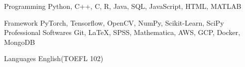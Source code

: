 \vspace{-5.0mm}         
\begin{cvskills}

\cvskill
   {Programming} %
    {Python, C++, C, R, Java, SQL, JavaScript, HTML, MATLAB} %

  \cvskill
    {Framework} %
    {PyTorch, Tensorflow, OpenCV, NumPy, Scikit-Learn, SciPy} %
  \cvskill
   {Professional Softwares} %
   {Git, LaTeX, SPSS, Mathematica, AWS, GCP, Docker, MongoDB} %

  \cvskill
   {Languages} %
   {English(TOEFL 102)} %
 \vspace{-8.0mm}  
\end{cvskills}
